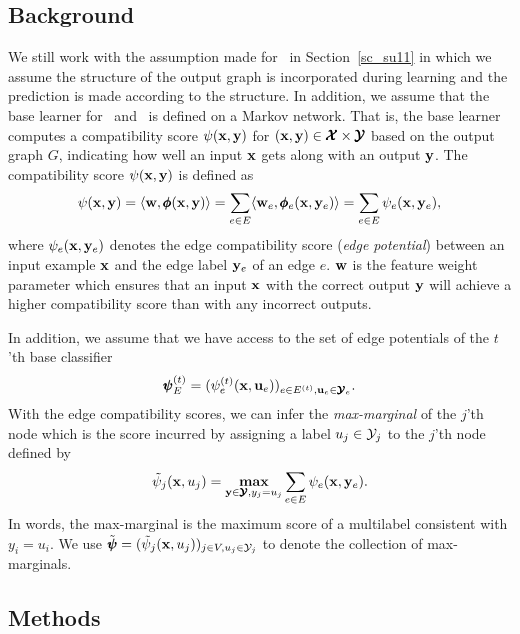 {%
%
\subsection{Background}

We still work with the assumption made for \mve\ in Section~\ref{sc_su11} in which we assume the structure of the output graph is incorporated during learning and the prediction is made according to the structure.
In addition, we assume that the base learner for \amm\ and \mam\ is defined on a Markov network.
That is, the base learner computes a compatibility score $\psi(\mathbf {x},\mathbf {y})$ for $(\mathbf {x},\mathbf {y})\in\pmb {\mathcal{X}}\times\pmb {\mathcal{Y}}$ based on the output graph $G$, indicating how well an input $\mathbf {x}$ gets along with an output $\mathbf {y}$.
The compatibility score $\psi(\mathbf {x},\mathbf {y})$ is defined as
\begin{align*}
	\psi(\mathbf {x},\mathbf {y}) = \langle \mathbf {w}, \pmb \phi(\mathbf {x},\mathbf {y}) \rangle = \sum_{e\in E}\langle \mathbf {w}_e, \pmb \phi_e(\mathbf {x},\mathbf {y}_e) \rangle=\sum_{e\in E}\psi_e(\mathbf {x},\mathbf {y}_e),
\end{align*}
where $\psi_e(\mathbf {x},\mathbf {y}_e)$ denotes the edge compatibility score (\textit{edge potential}) between an input example $\mathbf {x}$ and the edge label $\mathbf {y}_e$ of an edge $e$.
$\mathbf {w}$ is the feature weight parameter which ensures that an input $\mathbf {x}$ with the correct output $\mathbf {y}$ will achieve a higher compatibility score than with any incorrect outputs.

In addition, we assume that we have access to the set of edge potentials of the $t$'th base classifier 
\begin{align*}
	\pmb \psi_E^{(t)} = (\psi_e^{(t)}(\mathbf {x},\mathbf {u}_e))_{e\in E^{(t)},\mathbf {u}_e\in\pmb {\mathcal{Y}}_e}.
\end{align*}
With the edge compatibility scores, we can infer the \textit{max-marginal} \citep{Wainwright05map} of the $j$'th node which is the score incurred by assigning a label $u_j\in\mathcal{Y}_j$ to the $j$'th node defined by
\begin{align*}
	\tilde{\psi}_j(\mathbf {x},u_j) = \underset{\mathbf {y}\in\pmb {\mathcal{Y}},y_j=u_j}{\textbf{max}}\sum_{e\in E}\psi_e(\mathbf {x},\mathbf {y}_e).
\end{align*}
In words, the max-marginal is the maximum score of a multilabel consistent with $y_i=u_i$.
We use $\tilde{\pmb \psi} = (\tilde{\psi}_j(\mathbf {x},u_j))_{j\in V,u_j\in\mathcal{Y}_j}$ to denote the collection of max-marginals.

\subsection{Methods}

}
